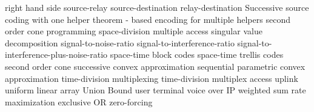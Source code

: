 {right hand side}
 {source-relay}
 {source-destination}
 {relay-destination}
 {Successive source coding with one helper theorem - based encoding for multiple helpers}
   {second order cone programming}
   {space-division multiple access}
   {singular value decomposition}
   {signal-to-noise-ratio}
   {signal-to-interference-ratio}
   {signal-to-interference-plus-noise-ratio}
   {space-time block codes}
   {space-time trellis codes}
   {second order cone}
   {successive convex approximation}
   {sequential parametric convex approximation}
   {time-division multiplexing}
   {time-division multiplex access}
   {uplink}
 {uniform linear array}
 {Union Bound}
 {user terminal}
   {voice over IP}
   {weighted sum rate maximization}
 {exclusive OR}
   {zero-forcing}

